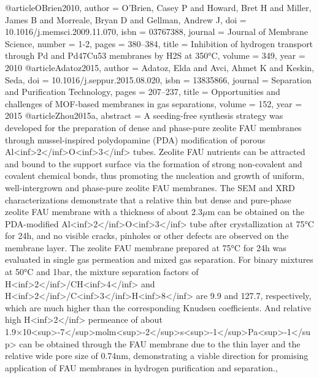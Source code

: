 @article{OBrien2010,
author = {O'Brien, Casey P and Howard, Bret H and Miller, James B and Morreale, Bryan D and Gellman, Andrew J},
doi = {10.1016/j.memsci.2009.11.070},
isbn = {03767388},
journal = {Journal of Membrane Science},
number = {1-2},
pages = {380--384},
title = {{Inhibition of hydrogen transport through Pd and Pd47Cu53 membranes by H2S at 350°C}},
volume = {349},
year = {2010}
}
@article{Adatoz2015,
author = {Adatoz, Elda and Avci, Ahmet K and Keskin, Seda},
doi = {10.1016/j.seppur.2015.08.020},
isbn = {13835866},
journal = {Separation and Purification Technology},
pages = {207--237},
title = {{Opportunities and challenges of MOF-based membranes in gas separations}},
volume = {152},
year = {2015}
}
@article{Zhou2015a,
abstract = {A seeding-free synthesis strategy was developed for the preparation of dense and phase-pure zeolite FAU membranes through mussel-inspired polydopamine (PDA) modification of porous Al{\textless}inf{\textgreater}2{\textless}/inf{\textgreater}O{\textless}inf{\textgreater}3{\textless}/inf{\textgreater} tubes. Zeolite FAU nutrients can be attracted and bound to the support surface via the formation of strong non-covalent and covalent chemical bonds, thus promoting the nucleation and growth of uniform, well-intergrown and phase-pure zeolite FAU membranes. The SEM and XRD characterizations demonstrate that a relative thin but dense and pure-phase zeolite FAU membrane with a thickness of about 2.3$\mu$m can be obtained on the PDA-modified Al{\textless}inf{\textgreater}2{\textless}/inf{\textgreater}O{\textless}inf{\textgreater}3{\textless}/inf{\textgreater} tube after crystallization at 75°C for 24h, and no visible cracks, pinholes or other defects are observed on the membrane layer. The zeolite FAU membrane prepared at 75°C for 24h was evaluated in single gas permeation and mixed gas separation. For binary mixtures at 50°C and 1bar, the mixture separation factors of H{\textless}inf{\textgreater}2{\textless}/inf{\textgreater}/CH{\textless}inf{\textgreater}4{\textless}/inf{\textgreater} and H{\textless}inf{\textgreater}2{\textless}/inf{\textgreater}/C{\textless}inf{\textgreater}3{\textless}/inf{\textgreater}H{\textless}inf{\textgreater}8{\textless}/inf{\textgreater} are 9.9 and 127.7, respectively, which are much higher than the corresponding Knudsen coefficients. And relative high H{\textless}inf{\textgreater}2{\textless}/inf{\textgreater} permeance of about 1.9×10{\textless}sup{\textgreater}-7{\textless}/sup{\textgreater}molm{\textless}sup{\textgreater}-2{\textless}/sup{\textgreater}s{\textless}sup{\textgreater}-1{\textless}/sup{\textgreater}Pa{\textless}sup{\textgreater}-1{\textless}/sup{\textgreater} can be obtained through the FAU membrane due to the thin layer and the relative wide pore size of 0.74nm, demonstrating a viable direction for promising application of FAU membranes in hydrogen purification and separation.},
}
